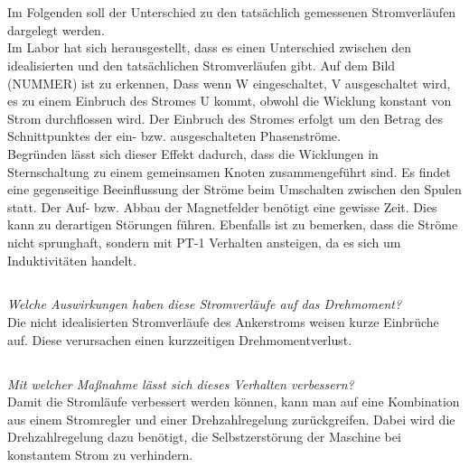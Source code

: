 \chapter{}\label{ch:auf6}
\section{}\label{sec:6a}
Im Folgenden soll der Unterschied zu den tatsächlich gemessenen Stromverläufen dargelegt werden.\\ 
Im Labor hat sich herausgestellt, dass es einen Unterschied zwischen den idealisierten und den tatsächlichen Stromverläufen gibt. Auf dem Bild (NUMMER) ist zu erkennen, Dass wenn W eingeschaltet, V ausgeschaltet wird, es zu einem Einbruch des Stromes U kommt, obwohl die Wicklung konstant von Strom durchflossen wird. Der Einbruch des Stromes erfolgt um den Betrag des Schnittpunktes der ein- bzw. ausgeschalteten Phasenströme. \\
Begründen lässt sich dieser Effekt dadurch, dass die Wicklungen in Sternschaltung zu einem gemeinsamen Knoten zusammengeführt sind. Es findet eine gegenseitige Beeinflussung der Ströme beim Umschalten zwischen den Spulen statt. Der Auf- bzw. Abbau der Magnetfelder benötigt eine gewisse Zeit. Dies kann zu derartigen Störungen führen. Ebenfalls ist zu bemerken, dass die Ströme nicht sprunghaft, sondern mit PT-1 Verhalten ansteigen, da es sich um Induktivitäten handelt.

\section{}\label{sec:6b}
\textit{Welche Auswirkungen haben diese Stromverläufe auf das Drehmoment?}\\
Die nicht idealisierten Stromverläufe des Ankerstroms weisen kurze Einbrüche auf. Diese verursachen einen kurzzeitigen Drehmomentverlust.

\section{}\label{sec:6c}
\textit{Mit welcher Maßnahme lässt sich dieses Verhalten verbessern?}\\
Damit die Stromläufe verbessert werden können, kann man auf eine Kombination aus einem Stromregler und einer Drehzahlregelung zurückgreifen. Dabei wird die Drehzahlregelung dazu benötigt, die Selbstzerstörung der Maschine bei konstantem Strom zu verhindern.
